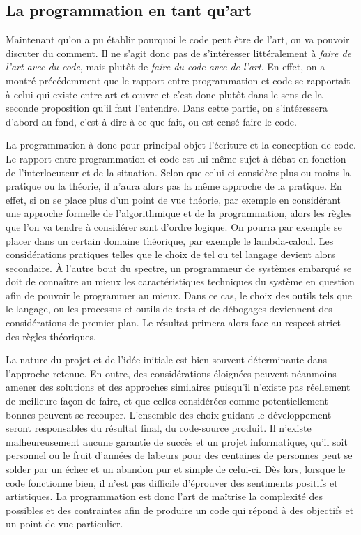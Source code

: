 \documentclass[12pt]{article} %
\begin{document}
\subsection{La programmation en tant qu'art} %
Maintenant qu'on a pu établir pourquoi le code peut être de l'art, on va pouvoir discuter du comment. Il ne s'agit donc pas de s'intéresser littéralement à \textit{faire de l'art avec du code}, mais plutôt de \textit{faire du code avec de l'art}. En effet, on a montré précédemment que le rapport entre programmation et code se rapportait à celui qui existe entre art et œuvre et c'est donc plutôt dans le sens de la seconde proposition qu'il faut l'entendre. Dans cette partie, on s'intéressera d'abord au fond, c'est-à-dire à ce que fait, ou est censé faire le code. 

La programmation à donc pour principal objet l'écriture et la conception de code. Le rapport entre programmation et code est lui-même sujet à débat en fonction de l'interlocuteur et de la situation. Selon que celui-ci considère plus ou moins la pratique ou la théorie, il n'aura alors pas la même approche de la pratique. En effet, si on se place plus d'un point de vue théorie, par exemple en considérant une approche formelle de l'algorithmique et de la programmation, alors les règles que l'on va tendre à considérer sont d'ordre logique. On pourra par exemple se placer dans un certain domaine théorique, par exemple le lambda-calcul. Les considérations pratiques telles que le choix de tel ou tel langage devient alors secondaire. À l'autre bout du spectre, un programmeur de systèmes embarqué se doit de connaître au mieux les caractéristiques techniques du système en question afin de pouvoir le programmer au mieux. Dans ce cas, le choix des outils tels que le langage, ou les processus et outils de tests et de débogages deviennent des considérations de premier plan. Le résultat primera alors face au respect strict des règles théoriques. 

La nature du projet et de l'idée initiale est bien souvent déterminante dans l'approche retenue. En outre, des considérations éloignées peuvent néanmoins amener des solutions et des approches similaires puisqu'il n'existe pas réellement de meilleure façon de faire, et que celles considérées comme potentiellement bonnes peuvent se recouper. L'ensemble des choix guidant le développement seront responsables du résultat final, du code-source produit. Il n'existe malheureusement aucune garantie de succès et un projet informatique, qu'il soit personnel ou le fruit d'années de labeurs pour des centaines de personnes peut se solder par un échec et un abandon pur et simple de celui-ci. Dès lors, lorsque le code fonctionne bien, il n'est pas difficile d'éprouver des sentiments positifs et artistiques. La programmation est donc l'art de maîtrise la complexité des possibles et des contraintes afin de produire un code qui répond à des objectifs et un point de vue particulier.
\end{document}
